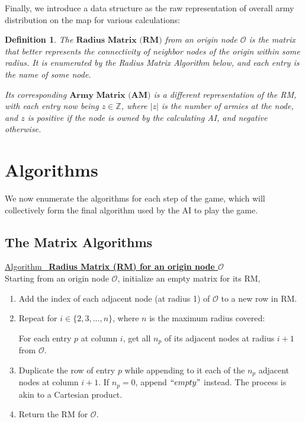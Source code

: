 \documentclass[12pt]{article}  %
\newtheorem{definition}{Definition}
\newcommand{\algtitle}[1]{\underline{Algorithm \ {\bf #1}} \vspace*{1mm}\\}
\begin{document}
Finally, we introduce a data structure as the raw representation of overall army distribution on the map for various calculations:

\begin{definition} \label{RMAM}
The $\textbf{Radius Matrix (RM)}$ from an origin node $\mathcal{O}$ is the matrix that better represents the connectivity of neighbor nodes of the origin within some radius. It is enumerated by the Radius Matrix Algorithm below, and each entry is the name of some node.

Its corresponding $\textbf{Army Matrix (AM)}$ is a different representation of the RM, with each entry now being $z \in \mathbb{Z}$, where $|z|$ is the number of armies at the node, and $z$ is positive if the node is owned by the calculating AI, and negative otherwise.
\end{definition}







\section{Algorithms}

We now enumerate the algorithms for each step of the game, which will collectively form the final algorithm used by the AI to play the game.


\subsection{The Matrix Algorithms}

\algtitle{Radius Matrix (RM) for an origin node $\mathcal{O}$}
Starting from an origin node $\mathcal{O}$, initialize an empty matrix for its RM,
\begin{enumerate}
	\item Add the index of each adjacent node (at radius 1) of $\mathcal{O}$ to a new row in RM.
	\item Repeat for $i \in \{2,3,...,n\}$, where $n$ is the maximum radius covered:
	
	For each entry $p$ at column $i$, get all $n_p$ of its adjacent nodes at radius $i+1$ from $\mathcal{O}$. 

	\item Duplicate the row of entry $p$ while appending to it each of the $n_p$ adjacent nodes at column $i+1$. If $n_p=0$, append $``empty"$ instead. The process is akin to a Cartesian product.

	\item Return the RM for $\mathcal{O}$.
\end{enumerate}
\end{document}
